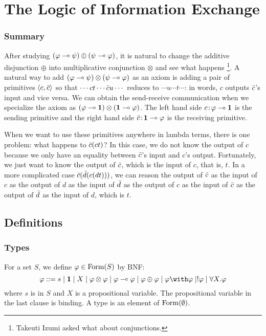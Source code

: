 \chapter{The Logic of Information Exchange}
\label{ch:exchange}

\subsection{Summary}

After studying $(\varphi\multimap\psi)\oplus (\psi\multimap\varphi)$,
it is natural to change the additive disjunction $\oplus$ into
multiplicative conjunction $\otimes$ and see what happens%
\footnote{Takeuti Izumi asked what about conjunctions.}.
A natural way to add $(\varphi\multimap\psi)\otimes(\psi\multimap\varphi)$ as an axiom
is adding a pair of primitives $\langle{c,\bar{c}}\rangle$ so that
$\cdots ct \cdots \bar{c} u \cdots$ reduces to
$\cdots u  \cdots t \cdots$: in words,
$c$ outputs $\bar{c}$'s input and vice versa.
We can obtain the send-receive communication when we specialize the
axiom as $(\varphi\multimap \mathbf{1})\otimes(\mathbf{1}\multimap\varphi)$.  The left hand side
${c} \mathord{\colon\kern -2pt}{\varphi\multimap\mathbf{1}}$ is the sending primitive and
the right hand side ${\bar{c}} \mathord{\colon\kern -2pt}{\mathbf{1} \multimap\varphi}$ is the receiving
primitive.

When we want to use these primitives anywhere in lambda terms,
there is one problem: what happens to $\bar{c}(c t)$?
In this case, we do not know the output of $c$ because we only have an
equality between $\bar{c}$'s input and $c$'s output.
Fortunately, we just want to know the output of $\bar{c}$, which is the
input of $c$, that is, $t$.
In a more complicated case $\bar{c}(\bar{d}(c (d t)))$,
we can reason the output of $\bar{c}$ as the input of $c$ as the output of
$d$ as the input of $\bar{d}$ as the output of $c$ as the input of $\bar{c}$
as the output of $\bar{d}$ as the input of $d$, which is $t$.

\section{Definitions}

\subsection{Types}
For a set $S$, we define $\varphi\in\mathop{\text{Form}}(S)$ by BNF:
\[
 \phi::=s\mid \one \mid X \mid \phi\otimes\phi\mid \phi\limp\phi\mid
 \phi\oplus\phi\mid \phi\with\phi\mid !\phi\mid \forall X.\phi
\]
where $s$ is in $S$ and $X$ is a propositional variable.
The propositional variable in the last clause is binding.
A type is an element of $\mathop{\text{Form}}(\emptyset)$.

